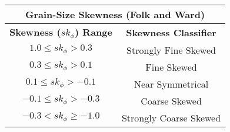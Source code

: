 \documentclass[10pt]{article}
\begin{document}
\begin{center}
\begin{tabular}{ c c  }
\multicolumn{2}{c}{\textbf{Grain-Size Skewness (Folk and Ward) }} \\
\hline
\textbf{Skewness ($sk_\phi$) Range} & \textbf{Skewness Classifier}  \\
\hline
$1.0 \le sk_\phi > 0.3 $               &  Strongly Fine Skewed   \\ 
$0.3 \le sk_\phi > 0.1 $    &  Fine Skewed   \\  
$0.1 \le sk_\phi > -0.1 $   &  Near Symmetrical  \\     
$-0.1 \le sk_\phi > -0.3 $    & Coarse Skewed    \\   
$-0.3 < sk_\phi \ge -1.0 $    & Strongly Coarse Skewed   \\
\end{tabular}
\end{center}
\end{document}
